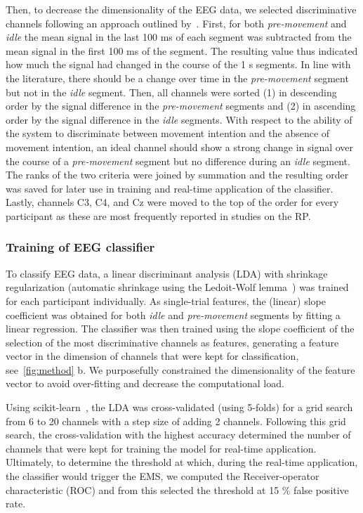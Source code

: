 Then, to decrease the dimensionality of the EEG data, we selected discriminative channels following an approach outlined by~\citep{Schultze-Kraft2021-cu}. First, for both \textit{pre-movement} and \textit{idle} the mean signal in the last 100 ms of each segment was subtracted from the mean signal in the first 100 ms of the segment. The resulting value thus indicated how much the signal had changed in the course of the 1 s segments. In line with the literature, there should be a change over time in the \textit{pre-movement} segment but not in the \textit{idle} segment. Then, all channels were sorted (1) in descending order by the signal difference in the \textit{pre-movement} segments and (2) in ascending order by the signal difference in the \textit{idle} segments. With respect to the ability of the system to discriminate between movement intention and the absence of movement intention, an ideal channel should show a strong change in signal over the course of a \textit{pre-movement} segment but no difference during an \textit{idle} segment. The ranks of the two criteria were joined by summation and the resulting order was saved for later use in training and real-time application of the classifier. Lastly, channels C3, C4, and Cz were moved to the top of the order for every participant as these are most frequently reported in studies on the RP.

\subsubsection{Training of EEG classifier}
To classify EEG data, a linear discriminant analysis (LDA) with shrinkage regularization (automatic shrinkage using the Ledoit-Wolf lemma~\cite{Ledoit2004-bi}) was trained for each participant individually. As single-trial features, the (linear) slope coefficient was obtained for both \textit{idle} and \textit{pre-movement} segments by fitting a linear regression. The classifier was then trained using the slope coefficient of the selection of the most discriminative channels as features, generating a feature vector in the dimension of channels that were kept for classification, see~\ref{fig:method} b. We purposefully constrained the dimensionality of the feature vector to avoid over-fitting and decrease the computational load.

Using scikit-learn~\cite{Pedregosa2012-sj}, the LDA was cross-validated (using 5-folds) for a grid search from 6 to 20 channels with a step size of adding 2 channels. Following this grid search, the cross-validation with the highest accuracy determined the number of channels that were kept for training the model for real-time application. Ultimately, to determine the threshold at which, during the real-time application, the classifier would trigger the EMS, we computed the Receiver-operator characteristic (ROC) and from this selected the threshold at 15 \% false positive rate.

